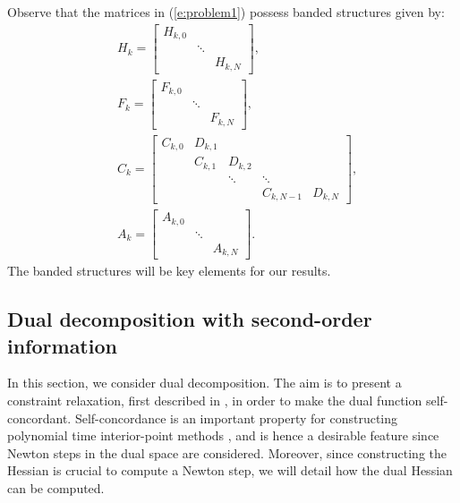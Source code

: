 Observe that the matrices in (\ref{e:problem1}) possess banded structures given by:
\begin{subequations}
\begin{align*}
& H_k = \left[ \begin{array}{ccc}
H_{k,0} & & \\
 & \ddots & \\
 & & H_{k,N}
\end{array} \right], \\
& F_k = \left[ \begin{array}{ccc}
F_{k,0} & & \\
 & \ddots & \\
 & & F_{k,N}
\end{array} \right], \\
& C_k = \left[ \begin{array}{ccccc} 
C_{k,0} & D_{k,1} &  &   &  \\
 & C_{k,1} & D_{k,2} &  &  \\
 &  & \ddots & \ddots &  \\
 &  &  & C_{k,N-1} & D_{k,N}
\end{array} \right], \\
& A_k = \left[ \begin{array}{ccc}
A_{k,0} & & \\
 & \ddots & \\
 & & A_{k,N}
\end{array} \right].
\end{align*}
\end{subequations}
The banded structures will be key elements for our results.

\subsection{Dual decomposition with second-order information} \label{s:DualDecomposition}
In this section, we consider dual decomposition. The aim is to present a constraint relaxation, first described in \cite{Necoara2009a}, in order to make the dual function self-concordant. Self-concordance is an important property for constructing polynomial time interior-point methods \cite{Nesterov1994}, and is hence a desirable feature since Newton steps in the dual space are considered. Moreover, since constructing the Hessian is crucial to compute a Newton step, we will detail how the dual Hessian can be computed.

